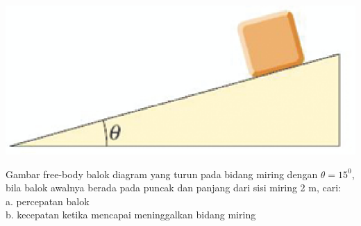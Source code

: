 \item
\mbox{}
\begin{center}
\includegraphics [scale=0.7]{./latex/eps/1_5_8_image_1.eps}
\end{center}
Gambar free-body balok diagram yang turun pada bidang miring dengan $\theta=15^{0}$, bila balok awalnya berada pada puncak dan panjang dari sisi miring 2 m, cari: \\
a. percepatan balok \\
b. kecepatan ketika mencapai meninggalkan bidang miring

